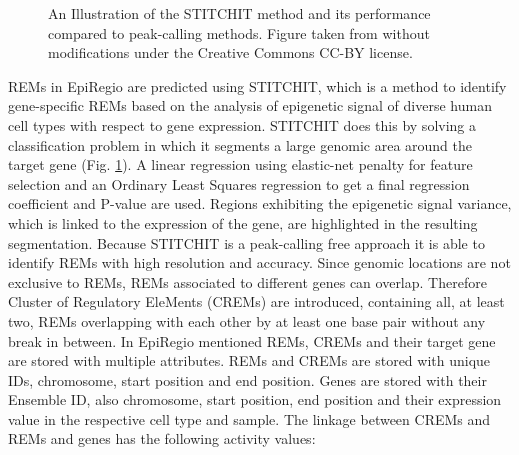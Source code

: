 \documentclass[pdftex,12pt,a4paper]{report}
\begin{document}
\begin{figure}[!ht]
\begin{center}
	\caption{An Illustration of the STITCHIT method and its performance compared to peak-calling methods. Figure taken from \cite{stitchit} without modifications under the Creative Commons CC-BY license.}
	\label{stitchit}
\end{center}
\end{figure}
REMs in EpiRegio are predicted using STITCHIT\cite{stitchit}, which is a method to identify gene-specific REMs based on the analysis of epigenetic signal of diverse human cell types with respect to gene expression. STITCHIT does this by solving a classification problem in which it segments a large genomic area around the target gene (Fig. \ref{stitchit}). A linear regression using elastic-net penalty for feature selection and an Ordinary Least Squares regression to get a final regression coefficient and P-value are used. Regions exhibiting the epigenetic signal variance, which is linked to the expression of the gene, are highlighted in the resulting segmentation. Because STITCHIT is a peak-calling free approach it is able to identify REMs with high resolution and accuracy. Since genomic locations are not exclusive to REMs, REMs associated to different genes can overlap. Therefore Cluster of Regulatory EleMents (CREMs) are introduced, containing all, at least two, REMs overlapping with each other by at least one base pair without any break in between. 
In EpiRegio mentioned REMs, CREMs and their target gene are stored with multiple attributes. REMs and CREMs are stored with unique IDs, chromosome, start position and end position. Genes are stored with their Ensemble ID, also chromosome, start position, end position and their expression value in the respective cell type and sample. The linkage between CREMs and REMs and genes has the following activity values:
\end{document}
